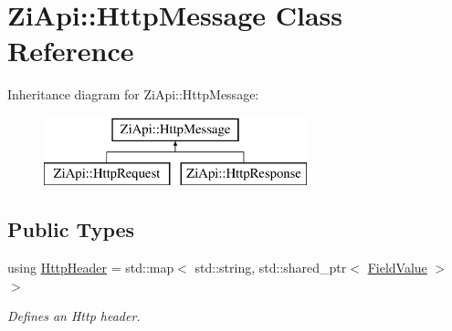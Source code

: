 \hypertarget{classZiApi_1_1HttpMessage}{}\section{Zi\+Api\+::Http\+Message Class Reference}
\label{classZiApi_1_1HttpMessage}
Inheritance diagram for Zi\+Api\+::Http\+Message\+:\begin{figure}[H]
\begin{center}
\leavevmode
\includegraphics[height=2.000000cm]{classZiApi_1_1HttpMessage}
\end{center}
\end{figure}
\subsection*{Public Types}
\begin{DoxyCompactItemize}
\item 
using \mbox{\hyperlink{classZiApi_1_1HttpMessage_ae086e821289425f1c653800caf8d39d0}{Http\+Header}} = std\+::map$<$ std\+::string, std\+::shared\+\_\+ptr$<$ \mbox{\hyperlink{classZiApi_1_1FieldValue}{Field\+Value}} $>$ $>$
\begin{DoxyCompactList}\small\item\em Defines an Http header. \end{DoxyCompactList}\end{DoxyCompactItemize}
